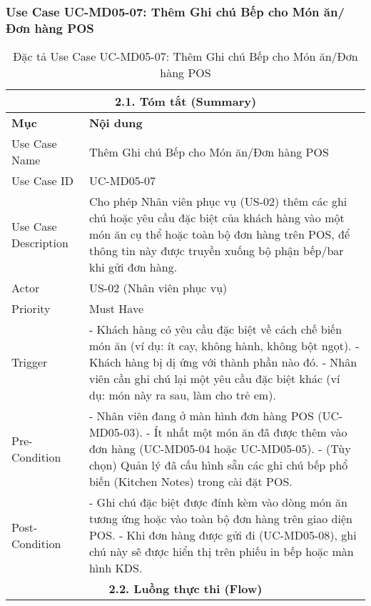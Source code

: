 \subsubsection{Use Case UC-MD05-07: Thêm Ghi chú Bếp cho Món ăn/Đơn hàng POS}
\begin{longtable}{|m{4cm}|p{11cm}|}
\caption{Đặc tả Use Case UC-MD05-07: Thêm Ghi chú Bếp cho Món ăn/Đơn hàng POS} \label{tab:uc_md05_07_final} \\
\hline
\multicolumn{2}{|c|}{\textbf{2.1. Tóm tắt (Summary)}} \\
\hline
\textbf{Mục} & \textbf{Nội dung} \\
\hline
\endhead %
\hline
\endfoot %
\hline
\endlastfoot %
Use Case Name & Thêm Ghi chú Bếp cho Món ăn/Đơn hàng POS \\
\hline
Use Case ID & UC-MD05-07 \\
\hline
Use Case Description & Cho phép Nhân viên phục vụ (US-02) thêm các ghi chú hoặc yêu cầu đặc biệt của khách hàng vào một món ăn cụ thể hoặc toàn bộ đơn hàng trên POS, để thông tin này được truyền xuống bộ phận bếp/bar khi gửi đơn hàng. \\
\hline
Actor & US-02 (Nhân viên phục vụ) \\
\hline
Priority & Must Have \\
\hline
Trigger & - Khách hàng có yêu cầu đặc biệt về cách chế biến món ăn (ví dụ: ít cay, không hành, không bột ngọt). \newline - Khách hàng bị dị ứng với thành phần nào đó. \newline - Nhân viên cần ghi chú lại một yêu cầu đặc biệt khác (ví dụ: món này ra sau, làm cho trẻ em). \\
\hline
Pre-Condition & - Nhân viên đang ở màn hình đơn hàng POS (UC-MD05-03). \newline - Ít nhất một món ăn đã được thêm vào đơn hàng (UC-MD05-04 hoặc UC-MD05-05). \newline - (Tùy chọn) Quản lý đã cấu hình sẵn các ghi chú bếp phổ biến (Kitchen Notes) trong cài đặt POS. \\
\hline
Post-Condition & - Ghi chú đặc biệt được đính kèm vào dòng món ăn tương ứng hoặc vào toàn bộ đơn hàng trên giao diện POS. \newline - Khi đơn hàng được gửi đi (UC-MD05-08), ghi chú này sẽ được hiển thị trên phiếu in bếp hoặc màn hình KDS. \\
\hline
\multicolumn{2}{|c|}{\textbf{2.2. Luồng thực thi (Flow)}} \\

\end{longtable}
